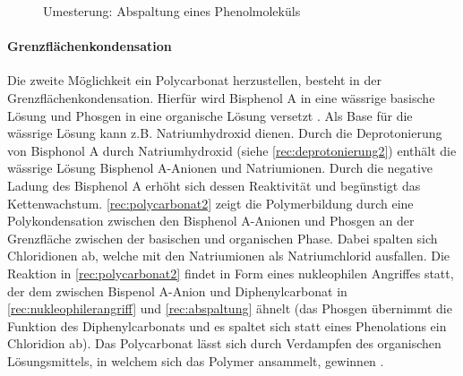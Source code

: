 \begin{figure}[H]
    \begin{center}
        \footnotesize
        \setatomsep{1.7em}


        \vspace{10pt}

        \chemrel{->}
        \chemnameinit{}
        \chemsign{+}

        \caption{Umesterung: Abspaltung eines Phenolmoleküls}
        \label{rec:abspaltung}
    \end{center}
\end{figure}

\paragraph{Grenzflächenkondensation} Die zweite Möglichkeit ein Polycarbonat
herzustellen, besteht in der Grenzflächenkondensation. Hierfür wird Bisphenol A
in eine wässrige basische Lösung und Phosgen in eine organische Lösung versetzt
\cite{cuzpe}. Als Base für die wässrige Lösung kann z.B. Natriumhydroxid dienen.
Durch die Deprotonierung von Bisphonol A durch Natriumhydroxid (siehe
\autoref{rec:deprotonierung2}) enthält die wässrige Lösung Bisphenol A-Anionen
und Natriumionen. Durch die negative Ladung des Bisphenol A erhöht sich dessen
Reaktivität und begünstigt das Kettenwachstum. \autoref{rec:polycarbonat2} zeigt
die Polymerbildung durch eine Polykondensation zwischen den Bisphenol A-Anionen
und Phosgen an der Grenzfläche zwischen der basischen und organischen Phase.
Dabei spalten sich Chloridionen ab, welche mit den Natriumionen als
Natriumchlorid ausfallen. Die Reaktion in \autoref{rec:polycarbonat2} findet in
Form eines nukleophilen Angriffes statt, der dem zwischen Bispenol A-Anion und
Diphenylcarbonat in \autoref{rec:nukleophilerangriff} und
\autoref{rec:abspaltung} ähnelt (das Phosgen übernimmt die Funktion des
Diphenylcarbonats und es spaltet sich statt eines Phenolations ein Chloridion
ab). Das Polycarbonat lässt sich durch Verdampfen des organischen
Lösungsmittels, in welchem sich das Polymer ansammelt, gewinnen \cite{garoo}.

